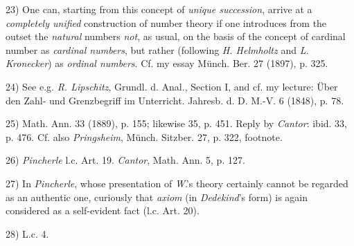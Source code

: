 \vfill
\leftline{\rule{2in}{0.4pt}}
\vspace{0.2cm}
{
\footnotesize
23) One can, starting from this concept of \textit{unique succession}, arrive at a \textit{completely unified} construction of number theory if one introduces from the outset the \textit{natural} numbers \textit{not}, as usual, on the basis of the concept of cardinal number as \textit{cardinal numbers}, but rather (following \textit{H. Helmholtz} and \textit{L. Kronecker}) as \textit{ordinal numbers}. Cf. my essay Münch. Ber. 27 (1897), p. 325.

24) See e.g. \textit{R. Lipschitz}, Grundl. d. Anal., Section I, and cf. my lecture: Über den Zahl- und Grenzbegriff im Unterricht. Jahresb. d. D. M.-V. 6 (1848), p. 78.

25) Math. Ann. 33 (1889), p. 155; likewise 35, p. 451. Reply by \textit{Cantor}: ibid. 33, p. 476. Cf. also \textit{Pringsheim}, Münch. Sitzber. 27, p. 322, footnote.

26) \textit{Pincherle} l.c. Art. 19. \textit{Cantor}, Math. Ann. 5, p. 127.

27) In \textit{Pincherle}, whose presentation of \textit{W}.'s theory certainly cannot be regarded as an authentic one, curiously that \textit{axiom} (in \textit{Dedekind}'s form) is again considered as a self-evident fact (l.c. Art. 20).

28) L.c. 4.

}